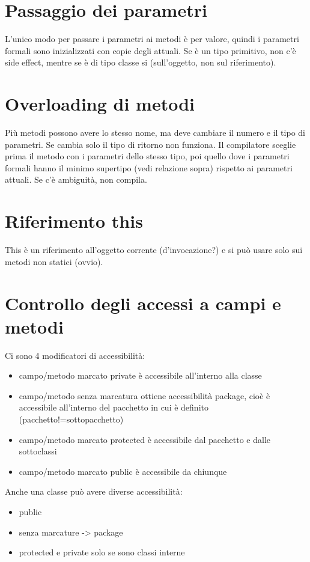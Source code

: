 \section{Passaggio dei parametri}
L'unico modo per passare i parametri ai metodi è per valore, quindi i parametri formali sono inizializzati con copie degli attuali. Se è un tipo primitivo, non c'è side effect, mentre se è di tipo classe si (sull'oggetto, non sul riferimento).

\section{Overloading di metodi}
Più metodi possono avere lo stesso nome, ma deve cambiare il numero e il tipo di parametri. Se cambia solo il tipo di ritorno non funziona.
Il compilatore sceglie prima il metodo con i parametri dello stesso tipo, poi quello dove i parametri formali hanno il minimo supertipo (vedi relazione sopra) rispetto ai parametri attuali.
Se c'è ambiguità, non compila.

\section{Riferimento this}
This è un riferimento all'oggetto corrente (d'invocazione?) e si può usare solo sui metodi non statici (ovvio).

\section{Controllo degli accessi a campi e metodi}
Ci sono 4 modificatori di accessibilità:
\begin{itemize}

\item campo/metodo marcato private è accessibile all'interno alla classe
\item campo/metodo senza marcatura ottiene accessibilità package, cioè è accessibile all'interno del pacchetto in cui è definito (pacchetto!=sottopacchetto)
\item campo/metodo marcato protected è accessibile dal pacchetto e dalle sottoclassi
\item campo/metodo marcato public è accessibile da chiunque
\end{itemize}

Anche una classe può avere diverse accessibilità:
\begin{itemize}
\item public
\item senza marcature -> package
\item protected e private solo se sono classi interne
\end{itemize}

